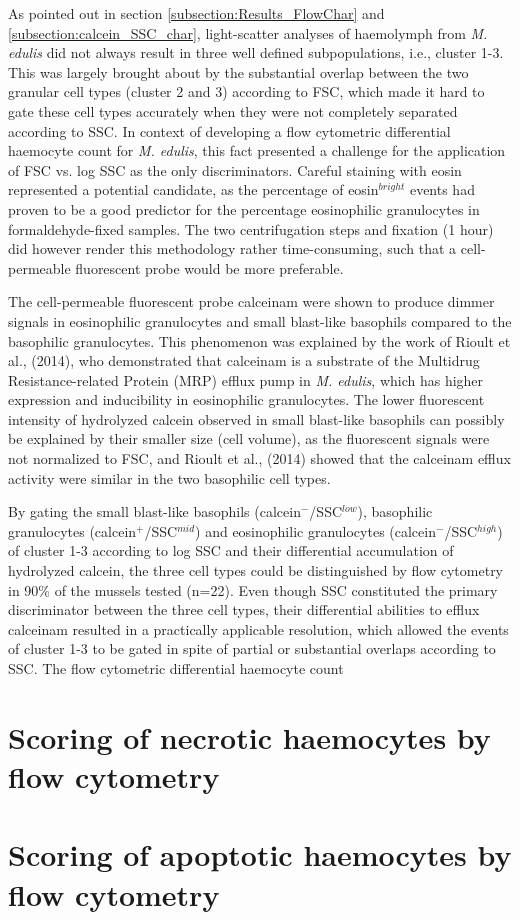 As pointed out in section \ref{subsection:Results_FlowChar} and \ref{subsection:calcein_SSC_char}, light-scatter analyses of haemolymph from \emph{M. edulis} did not always result in three well defined subpopulations, i.e., cluster 1-3. This was largely brought about by the substantial overlap between the two granular cell types (cluster 2 and 3) according to FSC, which made it hard to gate these cell types accurately when they were not completely separated according to SSC. In context of developing a flow cytometric differential haemocyte count for \emph{M. edulis}, this fact presented a challenge for the application of FSC vs. log SSC as the only discriminators. Careful staining with eosin represented a potential candidate, as the percentage of eosin$^{bright}$ events had proven to be a good predictor for the percentage eosinophilic granulocytes in formaldehyde-fixed samples. The two centrifugation steps and fixation (1 hour) did however render this methodology rather time-consuming, such that a cell-permeable fluorescent probe would be more preferable.

The cell-permeable fluorescent probe \acrshort{calceinam} were shown to produce dimmer signals in eosinophilic granulocytes and small blast-like basophils compared to the basophilic granulocytes. This phenomenon was explained by the work of Rioult et al., (2014), who demonstrated that \acrshort{calceinam} is a substrate of the Multidrug Resistance-related Protein (MRP) efflux pump in \emph{M. edulis}, which has higher expression and inducibility in eosinophilic granulocytes. The lower fluorescent intensity of hydrolyzed calcein observed in small blast-like basophils can possibly be explained by their smaller size (cell volume), as the fluorescent signals were not normalized to FSC, and Rioult et al., (2014) showed that the \acrshort{calceinam} efflux activity were similar in the two basophilic cell types.

By gating the small blast-like basophils (calcein$^{-}$/SSC$^{low}$), basophilic granulocytes (calcein$^{+}$/SSC$^{mid}$) and eosinophilic granulocytes (calcein$^{-}$/SSC$^{high}$) of cluster 1-3 according to log SSC and their differential accumulation of hydrolyzed calcein, the three cell types could be distinguished by flow cytometry in 90\% of the mussels tested (n=22). Even though SSC constituted the primary discriminator between the three cell types, their differential abilities to efflux \acrshort{calceinam} resulted in a practically applicable resolution, which allowed the events of cluster 1-3 to be gated in spite of partial or substantial overlaps according to SSC. The flow cytometric differential haemocyte count

\section{Scoring of necrotic haemocytes by flow cytometry}






\section{Scoring of apoptotic haemocytes by flow cytometry}
